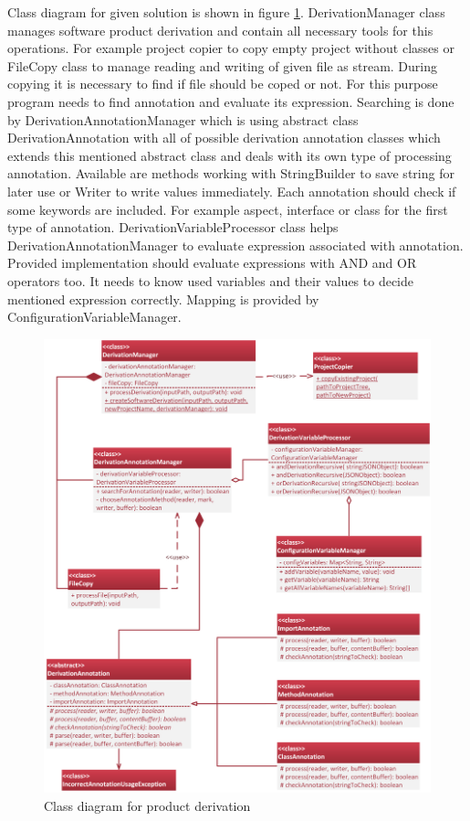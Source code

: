 \documentclass[11pt,english,a4paper,twoside]{article}
\begin{document}
Class diagram for given solution is shown in figure \ref{derivationProductClassDiagram}. DerivationManager class manages software product derivation and contain all necessary tools for this operations. For example project copier to copy empty project without classes or FileCopy class to manage reading and writing of given file as stream. During copying it is necessary to find if file should be coped or not. For this purpose program needs to find annotation and evaluate its expression. Searching is done by DerivationAnnotationManager which is using abstract class DerivationAnnotation with all of possible derivation annotation classes which extends this mentioned abstract class and deals with its own type of processing annotation. Available are methods working with StringBuilder to save string for later use or Writer to write values immediately. Each annotation should check if some keywords are included. For example aspect, interface or class for the first type of annotation. DerivationVariableProcessor class helps DerivationAnnotationManager to evaluate expression associated with annotation. Provided implementation should evaluate expressions with AND and OR operators too. It needs to know used variables and their values to decide mentioned expression correctly. Mapping is provided by ConfigurationVariableManager.

\begin{figure}[H]  %
					\begin{center}
									\includegraphics[width=\linewidth]{fig/DerivationClassTight.png}
									\caption{Class diagram for product derivation}
									\label{derivationProductClassDiagram}
					\end{center}
\end{figure}
\end{document}
